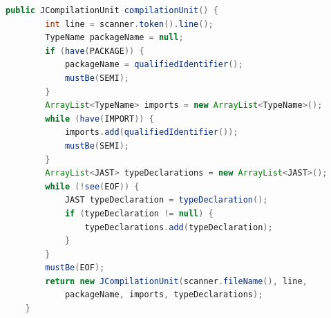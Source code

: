 \documentclass[8pt,a4paper,compress]{beamer}
\begin{document}
\begin{frame}[fragile]
\pause\transdissolve

\begin{tcolorbox}[enhanced,drop shadow southwest,sharp corners,size=fbox,colback=white,fontlower=\small\ttfamily,collower=silver900]

\begin{lstlisting}[language=Java,style=focusin]
    public JCompilationUnit compilationUnit() {
        int line = scanner.token().line();
        TypeName packageName = null;
        if (have(PACKAGE)) {
            packageName = qualifiedIdentifier();
            mustBe(SEMI);
        }
        ArrayList<TypeName> imports = new ArrayList<TypeName>();
        while (have(IMPORT)) {
            imports.add(qualifiedIdentifier());
            mustBe(SEMI);
        }
        ArrayList<JAST> typeDeclarations = new ArrayList<JAST>();
        while (!see(EOF)) {
            JAST typeDeclaration = typeDeclaration();
            if (typeDeclaration != null) {
                typeDeclarations.add(typeDeclaration);
            }
        }
        mustBe(EOF);
        return new JCompilationUnit(scanner.fileName(), line, 
            packageName, imports, typeDeclarations);
    }
\end{lstlisting}

\tcblower
\begin{minipage}[t][.25cm][t]{\textwidth}

\end{minipage}
\end{tcolorbox}
\end{frame}
\end{document}
